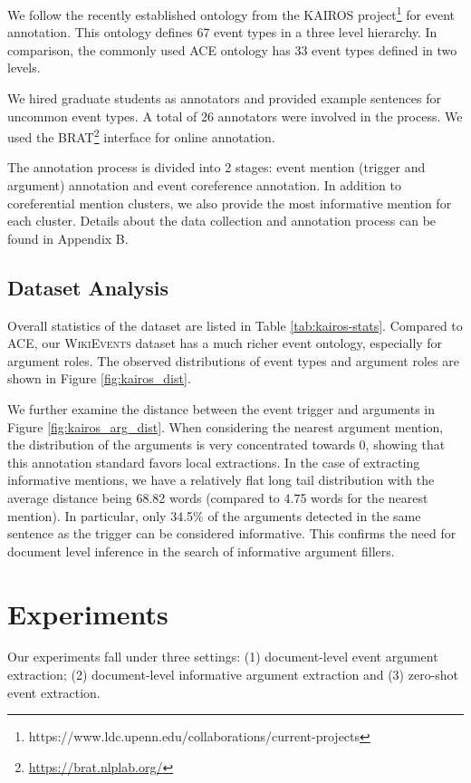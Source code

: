 We follow the recently established ontology from the KAIROS project\footnote{https://www.ldc.upenn.edu/collaborations/current-projects} for event annotation.
This ontology defines 67 event types in a three level hierarchy. In comparison, the commonly used ACE ontology has 33 event types defined in two levels.

We hired graduate students as annotators and provided example sentences for uncommon event types. 
A total of 26 annotators were involved in the process. We used the BRAT\footnote{\url{https://brat.nlplab.org/}} interface for online annotation.

The annotation process is divided into 2 stages: event mention (trigger and argument) annotation and event coreference annotation. In addition to coreferential mention clusters, we also provide the most informative mention for each cluster.
Details about the data collection and annotation process can be found in Appendix B.

\subsection{Dataset Analysis}
Overall statistics of the dataset are listed in Table \ref{tab:kairos-stats}.
Compared to \textsc{ACE}, our \textsc{WikiEvents} dataset has a much richer event ontology, especially for argument roles. 
The observed distributions of event types and argument roles are shown in Figure \ref{fig:kairos_dist}.

We further examine the distance between the event trigger and arguments in Figure \ref{fig:kairos_arg_dist}. When considering the nearest argument mention, the distribution of the arguments is very concentrated towards 0, showing that this annotation standard favors local extractions.
In the case of extracting informative mentions, we have a relatively flat long tail distribution with the average distance being 68.82 words (compared to 4.75 words for the nearest mention). 
In particular, only 34.5\% of the arguments detected in the same sentence as the trigger can be considered informative.
This confirms the need for document level inference in the search of informative argument fillers. 

\section{Experiments}
Our experiments fall under three settings: (1) document-level event argument extraction; (2) document-level informative argument extraction and (3) zero-shot event extraction. 


